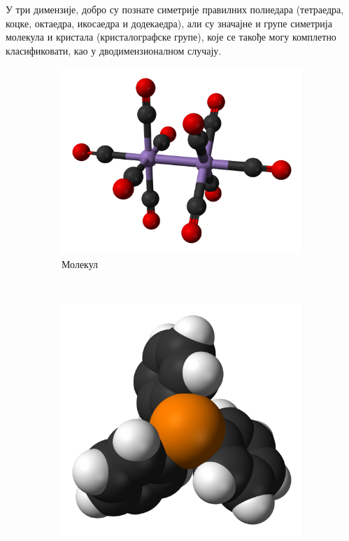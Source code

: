 \documentclass{report}
\theoremstyle{plain}
\theoremstyle{definition}
\begin{document}
У три димензије, добро су познате симетрије правилних полиедара (тетраедра, коцке, октаедра, икосаедра и додекаедра), али су значајне и групе симетрија молекула и кристала (кристалографске групе), које се такође могу комплетно класификовати, као у дводимензионалном случају.

\begin{figure}[h]
\centering
\begin{subfigure}{0.3\textwidth}
\includegraphics[width=\textwidth]{molekul3}
\caption{Молекул}
\end{subfigure}
~
\begin{subfigure}{0.3\textwidth}
\includegraphics[width=\textwidth]{molekul1}

\end{subfigure}
\end{figure}
\end{document}
